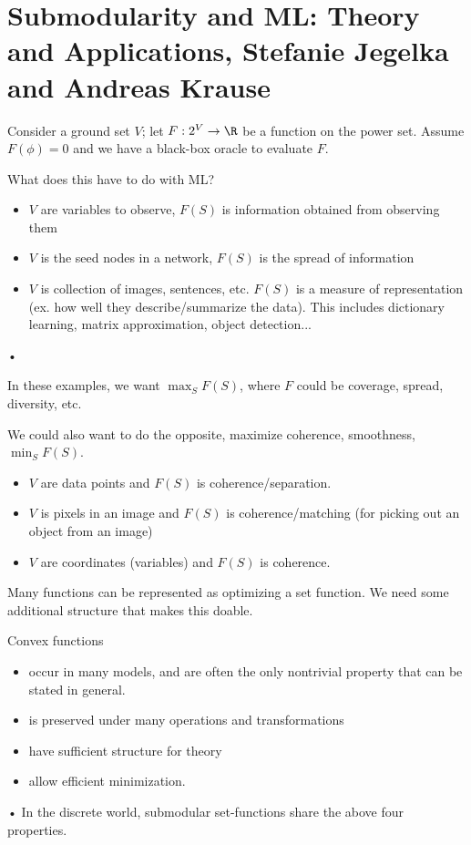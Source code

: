 \section{Submodularity and ML: Theory and Applications, Stefanie Jegelka and Andreas Krause}

Consider a ground set $V$; let $F:2^V\to \R$ be a function on the power set. Assume $F(\phi)=0$ and we have a black-box oracle to evaluate $F$. 

What does this  have to do with ML?

\begin{itemize}
\item
$V$ are variables to observe, $F(S)$ is information obtained from observing them
\item
$V$ is the seed nodes in a network, $F(S)$ is the spread of information
\item
$V$ is collection of images, sentences, etc. $F(S)$ is a measure of representation (ex. how well they describe/summarize the data). This includes dictionary learning, matrix approximation, object detection...
\end{itemize}•

In these examples, we want $\max_S F(S)$, where $F$ could be coverage, spread, diversity, etc. 

We could also want to do the opposite, maximize coherence, smoothness, $\min_S F(S)$.
\begin{itemize}
\item
$V$ are data points and $F(S)$ is coherence/separation.
\item
$V$ is pixels in an image and $F(S)$ is coherence/matching (for picking out an object from an image)
\item
$V$ are coordinates (variables) and $F(S)$ is coherence.
\end{itemize}

Many functions can be represented as optimizing a set function. We need some additional structure that makes this doable.

Convex functions 
\begin{itemize}
\item
occur  in many models, and are often the only nontrivial property that can be stated in general.
\item
is preserved under many operations and transformations
\item
have sufficient structure for theory
\item
allow efficient minimization.
\end{itemize}•
In the discrete world, submodular set-functions share the above four properties.

